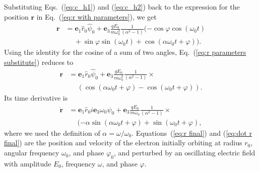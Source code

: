 \documentclass[twocolumn,showpacs,preprintnumbers,amsmath,amssymb]{revtex4}
\begin{document}
Substituting Eqs.~(\ref{eq:c_h1}) and (\ref{eq:c_h2}) back to the expression for the position $\mathbf r$ in Eq.~(\ref{eq:r with parameters}), we get
\begin{align}
\label{eq:r parameters substitute}
\mathbf r &= \mathbf e_1\hat r_0\hat\psi_0 + \mathbf e_3\frac{qE_0}{m\omega_0^2}\frac{1}{(\alpha^2 - 1)} (-\cos\varphi\cos(\omega_0t) \nonumber \\
&\quad \ +   \sin\varphi\sin(\omega_0t) + \cos(\alpha\omega_0 t +\varphi)).
\end{align}
Using the identity for the cosine of a sum of two angles, Eq.~(\ref{eq:r parameters substitute}) reduces to
\begin{align}
\label{eq:r final}
\mathbf r &= \mathbf e_1\hat r_0\hat\psi_0 + \mathbf e_3\frac{qE_0}{m\omega_0^2}\frac{1}{(\alpha^2 - 1)} \times \nonumber \\
&\quad \ (\cos(\alpha\omega_0 t +\varphi) - \cos(\omega_0t +\varphi)).
\end{align}
Its time derivative is 
\begin{align}
\label{eq:dot r final}
\dot{\mathbf r} &= \mathbf e_1\hat r_0 i \mathbf e_3 \omega_0\hat\psi_0 +\mathbf e_3\frac{qE_0}{m\omega_0}\frac{1}{(\alpha^2 - 1)} \times \nonumber \\
&\quad \ (-\alpha\sin(\alpha\omega_0 t + \varphi) + \sin(\omega_0 t + \varphi),
\end{align}
where we used the definition of $\alpha =\omega/\omega_0$.  Equations~(\ref{eq:r final}) and (\ref{eq:dot r final}) are the position and velocity of the electron initially orbiting at radius $r_0$, angular frequency $\omega_0$, and phase $\varphi_0$, and perturbed by an oscillating electric field with amplitude $E_0$, frequency $\omega$, and phase $\varphi$. 
\end{document}
